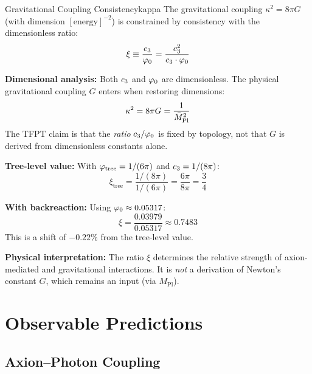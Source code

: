 \begin{corollary}{Gravitational Coupling Consistency}{kappa}
The gravitational coupling $\kappa^2 = 8\pi G$ (with dimension $[\text{energy}]^{-2}$) 
is constrained by consistency with the dimensionless ratio:
\begin{equation}
    \xi \equiv \frac{c_3}{\varphi_0} = \frac{c_3^2}{c_3 \cdot \varphi_0}
\end{equation}

\textbf{Dimensional analysis:} Both $c_3$ and $\varphi_0$ are dimensionless. The 
physical gravitational coupling $G$ enters when restoring dimensions:
\begin{equation}
    \kappa^2 = 8\pi G = \frac{1}{\bar{M}_{\mathrm{Pl}}^2}
\end{equation}
The TFPT claim is that the \emph{ratio} $c_3/\varphi_0$ is fixed by topology, 
not that $G$ is derived from dimensionless constants alone.

\textbf{Tree-level value:} With $\varphi_{\mathrm{tree}} = 1/(6\pi)$ and $c_3 = 1/(8\pi)$:
\begin{equation}
    \xi_{\text{tree}} = \frac{1/(8\pi)}{1/(6\pi)} = \frac{6\pi}{8\pi} = \frac{3}{4}
\end{equation}

\textbf{With backreaction:} Using $\varphi_0 \approx 0.05317$:
\begin{equation}
    \xi = \frac{0.03979}{0.05317} \approx 0.7483
\end{equation}
This is a shift of $-0.22\%$ from the tree-level value.

\textbf{Physical interpretation:} The ratio $\xi$ determines the relative strength 
of axion-mediated and gravitational interactions. It is \emph{not} a derivation of 
Newton's constant $G$, which remains an input (via $M_{\text{Pl}}$).
\end{corollary}

\section{Observable Predictions}

\subsection{Axion--Photon Coupling}

